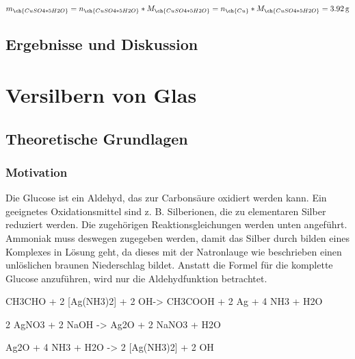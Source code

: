 \documentclass{article}
\begin{document}
        \begin{equation}
          m_{\ch{CuSO4 * 5 H2O}} = n_{\ch{CuSO4 * 5 H2O}} * M_{\ch{CuSO4 * 5 H2O}} = n_{\ch{Cu}}  * M_{\ch{CuSO4 * 5 H2O}} = \SI[mode=text]{3.92}{\gram}
        \end{equation}
        
    \subsection{Ergebnisse und Diskussion}
  
  
  
  \section{Versilbern von Glas}
  
    \subsection{Theoretische Grundlagen}
      
      \subsubsection{Motivation}
      
        Die Glucose ist ein Aldehyd, das zur Carbonsäure oxidiert werden kann. Ein geeignetes Oxidationsmittel sind z. B.  Silberionen, die zu elementaren Silber reduziert werden. Die zugehörigen Reaktionsgleichungen werden unten angeführt. Ammoniak muss deswegen zugegeben werden, damit das Silber durch bilden eines Komplexes in Lösung geht, da dieses mit der Natronlauge wie beschrieben einen unlöslichen braunen Niederschlag bildet. Anstatt die Formel für die komplette Glucose anzuführen, wird nur die Aldehydfunktion betrachtet.
        
        \begin{reaction}
          CH3CHO\aq{} + 2 [Ag(NH3)2]\pch\aq{} + 2 OH\mch\aq -> CH3COOH\aq{} + 2 Ag\sld{} + 4 NH3\aq{} + H2O \\
        \end{reaction}
        
        \begin{reaction}
          2 AgNO3\aq{} + 2 NaOH\aq{} -> Ag2O\sld{} + 2 NaNO3\aq{} + H2O\\
        \end{reaction}
        
        \begin{reaction}
          Ag2O\sld{} + 4 NH3\sld{} + H2O -> 2 [Ag(NH3)2]\pch\aq{} + 2 OH\mch\aq \\
        \end{reaction}
        
\end{document}
